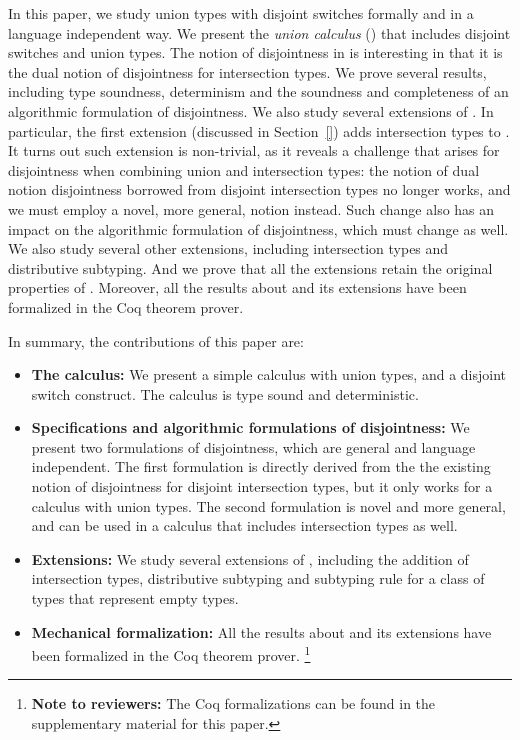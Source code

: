 In this paper, we study union types with disjoint switches formally
and in a language independent way. We present the \emph{union
  calculus} (\cal) that includes disjoint switches and union types.
The notion of disjointness in \cal is interesting in that it is
the dual notion of disjointness for intersection types.
We prove several results, including type soundness, determinism
and the soundness and completeness of an algorithmic formulation
of disjointness.
We also study several extensions of \cal. In particular,
the first extension (discussed in Section~\ref{}) adds intersection
types to \cal. It turns out such extension is non-trivial, as it reveals
a challenge that arises for disjointness when combining
union and intersection types:
the notion of dual notion disjointness borrowed from
disjoint intersection types no longer works, and we must employ
a novel, more general, notion instead. Such change also has an impact
on the algorithmic formulation of disjointness, which must change as
well. We also study several other extensions, including intersection
types and distributive subtyping. And we prove that all the extensions retain
the original properties of \cal. Moreover, all the results about \cal and its
extensions have been formalized in the Coq theorem prover.

In summary, the contributions of this paper are:

\begin{itemize}
\item {\bf The \name calculus:} We present a simple calculus with union
  types, and a disjoint switch construct. The calculus is type sound and
  deterministic. 
\item {\bf Specifications and algorithmic formulations of disjointness:}
  We present two formulations of disjointness, which are general and
  language independent. The first formulation is directly derived from
  the the existing notion of disjointness for disjoint intersection types,
  but it only works for a calculus with union types. The second formulation
  is novel and more general, and can be used in a calculus that includes
  intersection types as well.
\item {\bf Extensions:} We study several extensions of \name, including the
  addition of intersection types, distributive subtyping and
  subtyping rule for a class of types that represent empty types.
\item {\bf Mechanical formalization:}
  All the results about \cal and its
  extensions have been formalized in the Coq theorem prover.
  \footnote{{\bf Note to reviewers:} The Coq formalizations can be found in the
  supplementary material for this paper.}
\end{itemize}



